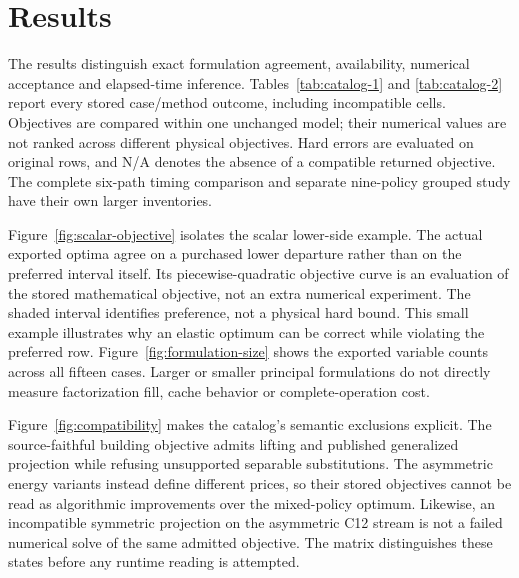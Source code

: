 \section{Results}\label{sec:results}
The results distinguish exact formulation agreement, availability, numerical
acceptance and elapsed-time inference. Tables~\ref{tab:catalog-1} and
\ref{tab:catalog-2} report every stored case/method outcome, including
incompatible cells. Objectives are compared within one unchanged model;
their numerical values are not ranked across different physical objectives.
Hard errors are evaluated on original rows, and N/A denotes the absence
of a compatible returned objective. The complete six-path timing comparison
and separate nine-policy grouped study have their own larger inventories.



Figure~\ref{fig:scalar-objective} isolates the scalar lower-side example.
The actual exported optima agree on a purchased lower departure rather than
on the preferred interval itself. Its piecewise-quadratic objective curve is an evaluation
of the stored mathematical objective, not an extra numerical experiment.
The shaded interval identifies preference, not a physical hard bound. This
small example illustrates why an elastic optimum can be correct while
violating the preferred row. Figure~\ref{fig:formulation-size} shows the
exported variable counts across all fifteen cases. Larger or smaller principal
formulations do not directly measure factorization fill, cache behavior or
complete-operation cost.



Figure~\ref{fig:compatibility} makes the catalog's semantic exclusions explicit.
The source-faithful building objective admits lifting and published generalized
projection while refusing unsupported separable substitutions. The asymmetric
energy variants instead define different prices, so their stored objectives
cannot be read as algorithmic improvements over the mixed-policy optimum.
Likewise, an incompatible symmetric projection on the asymmetric C12 stream
is not a failed numerical solve of the same admitted objective. The matrix
distinguishes these states before any runtime reading is attempted.


